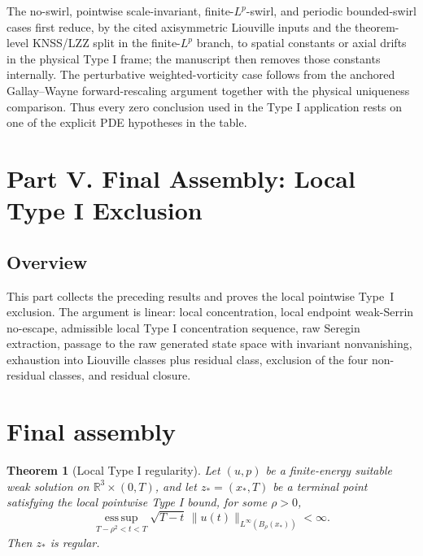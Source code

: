 \documentclass[11pt]{amsart}
\theoremstyle{plain}
\newtheorem{theorem}{Theorem}[section]
\theoremstyle{definition}
\theoremstyle{remark}
\numberwithin{equation}{section}
\newcommand{\R}{\mathbb R}
\newcommand{\esssup}{\operatorname*{ess\,sup}}
\begin{document}
The no-swirl, pointwise scale-invariant, finite-\(L^p\)-swirl, and periodic
bounded-swirl cases first reduce, by the cited axisymmetric Liouville inputs
and the theorem-level KNSS/LZZ split in the finite-\(L^p\) branch, to spatial
constants or axial drifts in the physical Type I frame; the manuscript then
removes those constants internally.  The perturbative weighted-vorticity case
follows from the anchored Gallay--Wayne forward-rescaling argument together
with the physical uniqueness comparison.
Thus every zero conclusion used in the Type I application rests on one of the
explicit PDE hypotheses in the table.

\clearpage
\section*{Part V. Final Assembly: Local Type I Exclusion}
\label{p1:sec:final-assembly}

\subsection*{Overview}

This part collects the preceding results and proves the local pointwise Type~I
exclusion.  The argument is linear: local concentration, local endpoint
weak-Serrin no-escape, admissible
local Type I concentration sequence, raw Seregin extraction, passage to the
raw generated state space with invariant nonvanishing, exhaustion into
Liouville classes plus residual class, exclusion of the four non-residual
classes, and residual closure.

\section{Final assembly}

\begin{theorem}[Local Type I regularity]
\label{p1:thm:final-assembly}
Let \((u,p)\) be a finite-energy suitable weak solution on
\(\R^3\times(0,T)\), and let \(z_*=(x_*,T)\) be a terminal point satisfying
the local pointwise Type I bound, for some \(\rho>0\),
\[
  \esssup_{T-\rho^2<t<T}
  \sqrt{T-t}\,\|u(t)\|_{L^\infty(B_\rho(x_*))}<\infty .
\]
Then \(z_*\) is regular.
\end{theorem}
\end{document}
